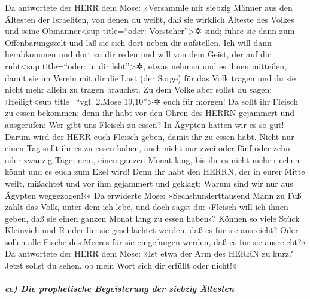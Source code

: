 Da antwortete der HERR dem Mose: »Versammle mir siebzig
Männer aus den Ältesten der Israeliten, von denen du weißt, daß sie
wirklich Älteste des Volkes und seine Obmänner\textless sup
title=``oder: Vorsteher''\textgreater✲ sind; führe sie dann zum
Offenbarungszelt und laß sie sich dort neben dir aufstellen.
Ich will dann herabkommen und dort zu dir reden und will
von dem Geist, der auf dir ruht\textless sup title=``oder: in dir
lebt''\textgreater✲, etwas nehmen und es ihnen mitteilen, damit sie im
Verein mit dir die Last (der Sorge) für das Volk tragen und du sie nicht
mehr allein zu tragen brauchst. Zu dem Volke aber sollst
du sagen: ›Heiligt\textless sup title=``vgl. 2.Mose 19,10''\textgreater✲
euch für morgen! Da sollt ihr Fleisch zu essen bekommen; denn ihr habt
vor den Ohren des HERRN gejammert und ausgerufen: Wer gibt uns Fleisch
zu essen? In Ägypten hatten wir es so gut! Darum wird der HERR euch
Fleisch geben, damit ihr zu essen habt. Nicht nur einen
Tag sollt ihr es zu essen haben, auch nicht nur zwei oder fünf oder zehn
oder zwanzig Tage: nein, einen ganzen Monat lang, bis ihr
es nicht mehr riechen könnt und es euch zum Ekel wird! Denn ihr habt den
HERRN, der in eurer Mitte weilt, mißachtet und vor ihm gejammert und
geklagt: Warum sind wir nur aus Ägypten weggezogen!‹« Da
erwiderte Mose: »Sechshunderttausend Mann zu Fuß zählt das Volk, unter
dem ich lebe, und doch sagst du: ›Fleisch will ich ihnen geben, daß sie
einen ganzen Monat lang zu essen haben‹? Können so viele
Stück Kleinvieh und Rinder für sie geschlachtet werden, daß es für sie
ausreicht? Oder sollen alle Fische des Meeres für sie eingefangen
werden, daß es für sie ausreicht?« Da antwortete der HERR
dem Mose: »Ist etwa der Arm des HERRN zu kurz? Jetzt sollst du sehen, ob
mein Wort sich dir erfüllt oder nicht!«

\hypertarget{ee-die-prophetische-begeisterung-der-siebzig-uxe4ltesten}{%
\subparagraph{ee) Die prophetische Begeisterung der siebzig
Ältesten}\label{ee-die-prophetische-begeisterung-der-siebzig-uxe4ltesten}}

